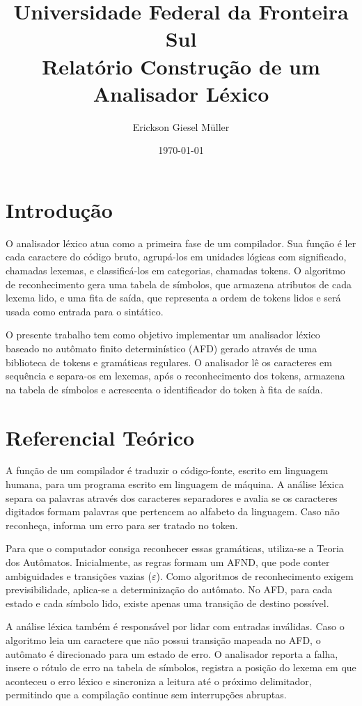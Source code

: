 \documentclass[12pt, a4paper]{article}
\title{Universidade Federal da Fronteira Sul\\
Relatório Construção de um Analisador Léxico}
\author{Erickson Giesel Müller}
\date{\today}
\begin{document}
\maketitle
\thispagestyle{empty} %


\section{Introdução}
	O analisador léxico atua como a primeira fase de um compilador. Sua função é ler cada caractere do código bruto, agrupá-los em unidades lógicas com significado, chamadas lexemas, e classificá-los em categorias, chamadas tokens. O algoritmo de reconhecimento gera uma tabela de símbolos, que armazena atributos de cada lexema lido, e uma fita de saída, que representa a ordem de tokens lidos e será usada como entrada para o sintático.

	O presente trabalho tem como objetivo implementar um analisador léxico baseado no autômato finito determinístico (AFD) gerado através de uma biblioteca de tokens e gramáticas regulares. O analisador lê os caracteres em sequência e separa-os em lexemas, após o reconhecimento dos tokens, armazena na tabela de símbolos e acrescenta o identificador do token à fita de saída.

\section{Referencial Teórico}
	A função de um compilador é traduzir o código-fonte, escrito em linguagem humana, para um programa escrito em linguagem de máquina. A análise léxica separa oa palavras através dos caracteres separadores  e avalia se os caracteres digitados formam palavras que pertencem ao alfabeto da linguagem. Caso não reconheça, informa um erro para ser tratado no token.

	Para que o computador consiga reconhecer essas gramáticas, utiliza-se a Teoria dos Autômatos. Inicialmente, as regras formam um AFND, que pode conter ambiguidades e transições vazias ($\varepsilon$). Como algoritmos de reconhecimento exigem previsibilidade, aplica-se a determinização do autômato. No AFD, para cada estado e cada símbolo lido, existe apenas uma transição de destino possível.	

	A análise léxica também é responsável por lidar com entradas inválidas. Caso o algoritmo leia um caractere que não possui transição mapeada no AFD, o autômato é direcionado para um estado de erro. O analisador reporta a falha, insere o rótulo de erro na tabela de símbolos, registra a posição do lexema em que aconteceu o erro léxico e sincroniza a leitura até o próximo delimitador, permitindo que a compilação continue sem interrupções abruptas.
\end{document}
